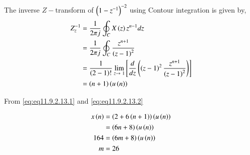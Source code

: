 \documentclass[journal,12pt,twocolumn]{IEEEtran}
\begin{document}
The inverse $Z-$transform of $\left(1-z^{-1}\right)^{-2}$ using Contour integration is given by,
\begin{align}
    Z_z^{-1} &= \frac{1}{2\pi j}\oint_C X\left(z\right)z^{n-1}dz\\
    &= \frac{1}{2\pi j}\oint_C \frac{z^{n+1}}{\left(z-1\right)^2}\\
    &= \frac{1}{\left(2-1\right)!} \lim_{z \to\ 1}{\left[ \frac{d}{dz}\left(\left(z-1\right)^2 \frac{z^{n+1}}{\left(z-1\right)^2}\right) \right]}\\
    &= \left(n+1\right)\left(u\left(n\right)\right) \label{eq:eq11.9.2.13.2}
\end{align}

From \eqref{eq:eq11.9.2.13.1} and \eqref{eq:eq11.9.2.13.2}

\begin{align}
    x\left(n\right) &= \left(2 + 6\left(n+1\right)\right)\left(u\left(n\right)\right)\\
    &= \left(6n+8\right)\left(u\left(n\right)\right)\\
    164 &= \left(6m+8\right)\left(u\left(n\right)\right)\\
    m &= 26
\end{align}


\end{document}
